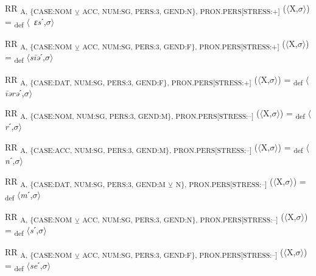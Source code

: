 {\begin{exe}
 RR \textsubscript{A, \{CASE:NOM} \textsubscript{${\veebar}$}\textsubscript{ ACC, NUM:SG, PERS:3, GEND:N\}, PRON.PERS[STRESS:+]} ($\langle$X,$\sigma $$\rangle$) = \textsubscript{def} \mbox{$\langle$ \textit{ɛs}ˊ,$\sigma $$\rangle$}
\end{exe}

\begin{exe}
 RR \textsubscript{A, \{CASE:NOM} \textsubscript{${\veebar}$}\textsubscript{ ACC, NUM:SG, PERS:3, GEND:F\}, PRON.PERS[STRESS:+]} ($\langle$X,$\sigma $$\rangle$) = \textsubscript{def} $\langle$\textit{s\=iə}ˊ,$\sigma $$\rangle$
\end{exe}

\begin{exe}
 RR \textsubscript{A, \{CASE:DAT, NUM:SG, PERS:3, GEND:F\}, PRON.PERS[STRESS:+]} ($\langle$X,$\sigma $$\rangle$) = \textsubscript{def} $\langle$\textit{\=iərə}ˊ,$\sigma $$\rangle$
\end{exe}

\begin{exe}
 RR \textsubscript{A, \{CASE:NOM, NUM:SG, PERS:3, GEND:M\}, PRON.PERS[STRESS:–]} ($\langle$X,$\sigma $$\rangle$) = \textsubscript{def} $\langle$\textit{r}ˊ,$\sigma $$\rangle$
\end{exe}

\begin{exe}
 RR \textsubscript{A, \{CASE:ACC, NUM:SG, PERS:3, GEND:M\}, PRON.PERS[STRESS:–]} ($\langle$X,$\sigma $$\rangle$) = \textsubscript{def} $\langle$\textit{n}ˊ,$\sigma $$\rangle$
\end{exe}

\begin{exe}
 RR \textsubscript{A, \{CASE:DAT, NUM:SG, PERS:3, GEND:M} \textsubscript{${\veebar}$}\textsubscript{ N\}, PRON.PERS[STRESS:–]} ($\langle$X,$\sigma $$\rangle$) = \textsubscript{def} $\langle$\textit{m}ˊ,$\sigma $$\rangle$
\end{exe}

\begin{exe}
 RR \textsubscript{A, \{CASE:NOM} \textsubscript{${\veebar}$}\textsubscript{ ACC, NUM:SG, PERS:3, GEND:N\}, PRON.PERS[STRESS:–]} ($\langle$X,$\sigma $$\rangle$) = \textsubscript{def} $\langle$\textit{s}ˊ,$\sigma $$\rangle$
\end{exe}

\begin{exe}
 RR \textsubscript{A, \{CASE:NOM} \textsubscript{${\veebar}$}\textsubscript{ ACC, NUM:SG, PERS:3, GEND:F\}, PRON.PERS[STRESS:–]} ($\langle$X,$\sigma $$\rangle$) = \textsubscript{def} $\langle$\textit{se}ˊ,$\sigma $$\rangle$
\end{exe}

}
